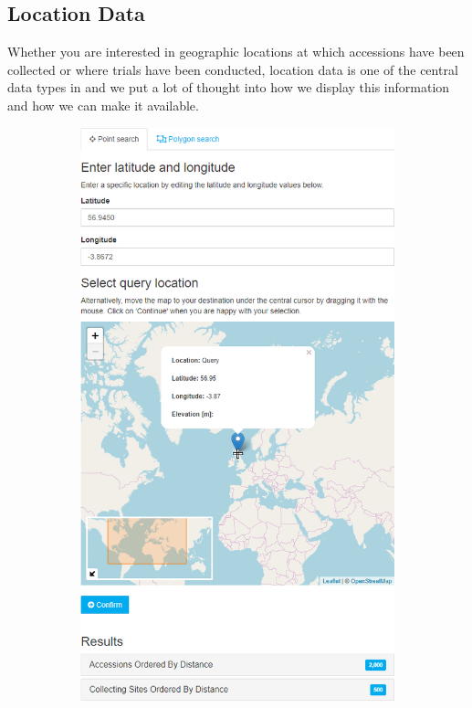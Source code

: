 \subsection{Location Data}
Whether you are interested in geographic locations at which accessions have been collected or where trials have been conducted, location data is one of the central data types in {\germinate} and we put a lot of thought into how we display this information and how we can make it available.

\begin{figure}
	\centering
	\begin{subfigure}[b]{0.47\linewidth}
		\includegraphics[width=1\linewidth]{img/features/location-search-point.png}

\end{subfigure}
\end{figure}
